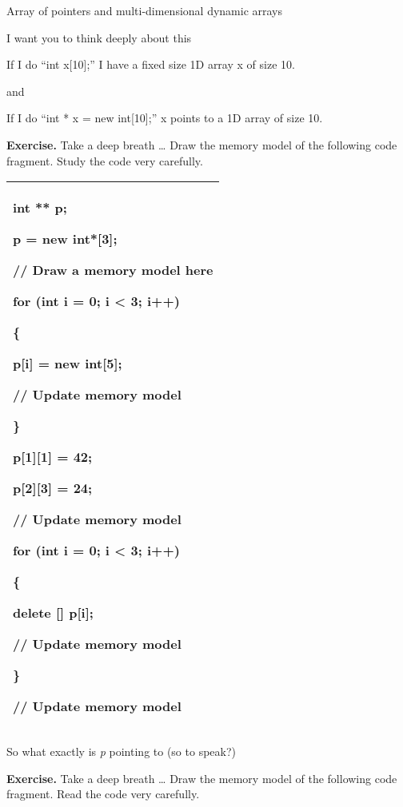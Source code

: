 \documentclass[
]{article}
\begin{document}
Array of pointers and multi-dimensional dynamic arrays

I want you to think deeply about this

If I do ``int x{[}10{]};'' I have a fixed size 1D array x of size 10.

and

If I do ``int * x = new int{[}10{]};'' x points to a 1D array of size
10.

\textbf{Exercise.} Take a deep breath \ldots{} Draw the memory model of
the following code fragment. Study the code very carefully.

\begin{longtable}[]{@{}l@{}}
\toprule
\endhead
\begin{minipage}[t]{0.97\columnwidth}\raggedright
int ** p;

p = new int*{[}3{]};

// Draw a memory model here

for (int i = 0; i \textless{} 3; i++)

\{

p{[}i{]} = new int{[}5{]};

// Update memory model

\}

p{[}1{]}{[}1{]} = 42;

p{[}2{]}{[}3{]} = 24;

// Update memory model

for (int i = 0; i \textless{} 3; i++)

\{

delete {[}{]} p{[}i{]};

// Update memory model

\}

// Update memory model\strut
\end{minipage}\tabularnewline
\bottomrule
\end{longtable}

So what exactly is \emph{p} pointing to (so to speak?)

\textbf{Exercise.} Take a deep breath \ldots{} Draw the memory model of
the following code fragment. Read the code very carefully.
\end{document}
